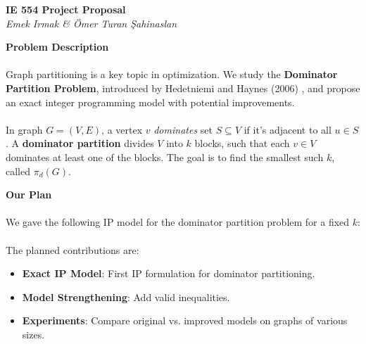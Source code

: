 \documentclass[12pt]{article}
\begin{document}

\begin{center}
    \Large \textbf{IE 554 Project Proposal} \\
    \normalsize \textsl{Emek Irmak \& Ömer Turan Şahinaslan}
\end{center}

\textbf{\large Problem Description}
\vspace*{-2mm}

\paragraph{} Graph partitioning is a key topic in optimization. We study the \textbf{Dominator Partition Problem}, introduced by Hedetniemi and Haynes (2006) \cite{dominator_partitions}, and propose an exact integer programming model with potential improvements.

\paragraph{} In graph $G = (V, E)$, a vertex $v$ \textit{dominates} set $S \subseteq V$ if it's adjacent to all $u \in S$. A \textbf{dominator partition} divides $V$ into $k$ blocks, such that each $v \in V$ dominates at least one of the blocks. The goal is to find the smallest such $k$, called $\pi_d(G)$.

\vspace{5mm}

\textbf{\large Our Plan}
\vspace*{-2mm}

\paragraph{} We gave the following IP model for the dominator partition problem for a fixed $k$:

\hspace{4mm}
\scalebox{0.95}{%
  \parbox{\linewidth}{%
  }%
}

\vspace{-6mm}
\paragraph{} The planned contributions are:
\begin{itemize}[label=, itemsep=0pt]
    \item \textbf{Exact IP Model}: First IP formulation for dominator partitioning.
    \item \textbf{Model Strengthening}: Add valid inequalities.
    \item \textbf{Experiments}: Compare original vs. improved models on graphs of various sizes.
\end{itemize}
\end{document}
